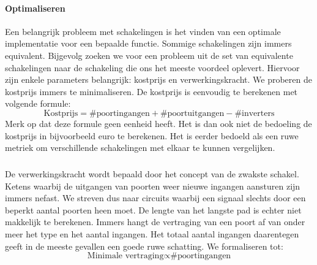 \paragraph{Optimaliseren}
Een belangrijk probleem met schakelingen is het vinden van een optimale implementatie voor een bepaalde functie. Sommige schakelingen zijn immers equivalent. Bijgevolg zoeken we voor een probleem uit de set van equivalente schakelingen naar de schakeling die ons het meeste voordeel oplevert. Hiervoor zijn enkele parameters belangrijk: kostprijs en verwerkingskracht. We proberen de kostprijs immers te minimaliseren. De kostprijs is eenvoudig te berekenen met volgende formule:
\begin{equation}
\mbox{Kostprijs}=\mbox{\#poortingangen}+\mbox{\#poortuitgangen}-\mbox{\#inverters}
\label{eqn:kosten}
\end{equation}
Merk op dat deze formule geen eenheid heeft. Het is dan ook niet de bedoeling de kostprijs in bijvoorbeeld euro te berekenen. Het is eerder bedoeld als een ruwe metriek om verschillende schakelingen met elkaar te kunnen vergelijken.
\subparagraph{}
De verwerkingskracht wordt bepaald door het concept van de zwakste schakel. Ketens waarbij de uitgangen van poorten weer nieuwe ingangen aansturen zijn immers nefast. We streven dus naar circuits waarbij een signaal slechts door een beperkt aantal poorten heen moet. De lengte van het langste pad is echter niet makkelijk te berekenen. Immers hangt de vertraging van een poort af van onder meer het type en het aantal ingangen. Het totaal aantal ingangen daarentegen geeft in de meeste gevallen een goede ruwe schatting. We formaliseren tot:
\begin{equation}
\mbox{Minimale vertraging}\propto\mbox{\#poortingangen}%
\end{equation}
